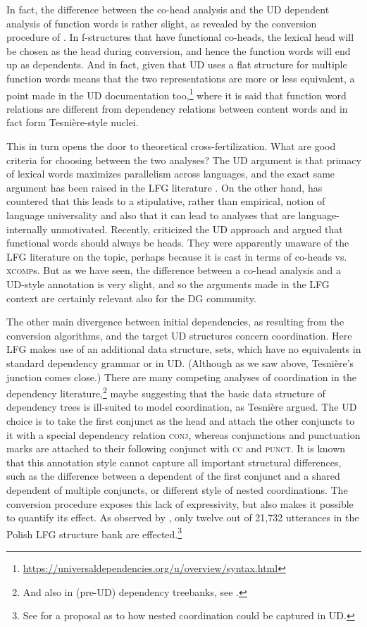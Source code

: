 \documentclass[output=paper,hidelinks]{langscibook}
\begin{document}
In fact, the difference between the co-head analysis and the UD
dependent analysis of function words is rather slight, as revealed by the
conversion procedure of \citet{prz:pat:19:lre}. In
f-structures that have functional co-heads, the lexical head will be
chosen as the head during conversion, and hence the function words
will end up as dependents. And in fact, given that UD uses a flat
structure for multiple function words means that the two
representations are more or less equivalent, a point made in the UD
documentation
too,\footnote{\url{https://universaldependencies.org/u/overview/syntax.html}}
where it is said that function word relations are different from
dependency relations between content words and in fact form
Tesnière-style nuclei.

This in turn opens the door to theoretical cross-fertilization. What
are good criteria for choosing between the two analyses? The UD
argument is that primacy of lexical words maximizes parallelism across
languages, and the exact same argument has been raised in the LFG
literature \citep{buttetal96}. On the other hand, \citet{dyvik99} has
countered that this leads to a stipulative, rather than empirical,
notion of language universality and also that it can lead to analyses
that are language-internally unmotivated. Recently,
\citet{OsborneGerdes2019} criticized the UD approach and argued that
functional words should always be heads. They were apparently unaware
of the LFG literature on the topic, perhaps because it is cast in terms of
co-heads vs. \textsc{xcomp}s. But as we have seen, the
difference between a co-head analysis and a UD-style annotation is
very slight, and so the arguments made in the LFG context are certainly relevant also for the DG community.

The other main divergence between initial dependencies, as resulting
from the conversion algorithms, and the target UD structures concern
coordination. Here LFG makes use of an additional data structure,
sets, which have no equivalents in standard dependency grammar or in
UD. (Although as we saw above, Tesnière's junction comes close.) There
are many competing analyses of coordination in the dependency
literature,\footnote{And also in (pre-UD) dependency treebanks, see \citet{pop:etal:13}.} maybe suggesting that the basic data structure of
dependency trees is ill-suited to model coordination, as
Tesnière argued. The UD choice is to take the first conjunct
as the head and attach the other conjuncts to it with a special
dependency relation \textsc{conj}, whereas conjunctions and
punctuation marks are attached to their following conjunct with
\textsc{cc} and \textsc{punct}. It is known that this annotation style
cannot capture all important structural differences, such as the
difference between a dependent of the first conjunct and a shared
dependent of multiple conjuncts, or different style of nested
coordinations. The conversion procedure exposes this lack of
expressivity, but also makes it possible to quantify its effect. As
observed by \citet{prz:pat:19:lre}, only twelve out of 21,732 utterances in the Polish LFG structure bank are effected.\footnote{See \citet{przepiorkowski-patejuk2019} for a proposal as to how nested coordination could be captured in UD.}
\end{document}
